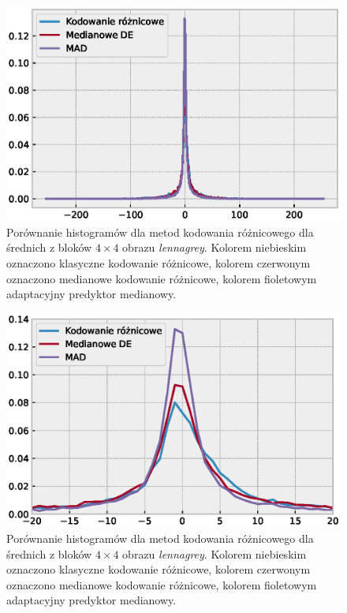 \documentclass{article}
\begin{document}
\begin{figure}[H]
  \centering
  \includegraphics[width=.9\linewidth]{images/differential_encoding_histograms_comparison.eps}
  \caption{Porównanie histogramów dla metod kodowania różnicowego dla średnich z bloków $4\times4$ obrazu \emph{lennagrey}. Kolorem niebieskim oznaczono klasyczne kodowanie różnicowe, kolorem czerwonym oznaczono medianowe kodowanie różnicowe, kolorem fioletowym adaptacyjny predyktor medianowy.}
  \label{fig:de_histograms_comparison}
\end{figure}

\begin{figure}[H]
  \centering
  \includegraphics[width=.9\linewidth]{images/differential_encoding_histograms_comparison_zoom.eps}
  \caption{Porównanie histogramów dla metod kodowania różnicowego dla średnich z bloków $4\times4$ obrazu \emph{lennagrey}. Kolorem niebieskim oznaczono klasyczne kodowanie różnicowe, kolorem czerwonym oznaczono medianowe kodowanie różnicowe, kolorem fioletowym adaptacyjny predyktor medianowy.}
  \label{fig:de_histograms_comparison_zoom}
\end{figure}
\end{document}
